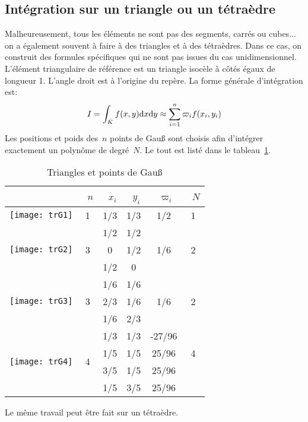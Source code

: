 \medskip
\subsection*{Intégration sur un triangle ou un tétraèdre} 

Malheureusement, tous les éléments ne sont pas des segments, carrés ou cubes... on a également souvent à faire à des triangles et à des tétraèdres. Dans ce cas, on construit des formules spécifiques qui ne sont pas issues du cas unidimensionnel. L'élément triangulaire de référence est un triangle isocèle à côtés égaux de longueur 1. L'angle droit est à l'origine du repère. La forme générale d'intégration est: 
\begin{equation}
 I=\int_{\hat{K}} f(x,y)\text{d} x\text{d} y \approx \sum_{i=1}^n \varpi_if(x_i,y_i) 
\end{equation}
Les positions et poids des~$n$ points de Gauß sont choisis afin d'intégrer exactement un polynôme de degré~$N$. Le tout est listé dans le tableau~\ref{tab:IntNum:TriGauss}.
\begin{table}[ht]\centering
\begin{tabular}{cccccc}
 &~$n$ &~$x_i$ &~$y_i$ &~$\varpi_i$ &~$N$\\ \hline 
 \texttt{[image: trG1]} & 1 & 1/3 & 1/3 & 1/2 & 1\\ \hline 
 \multirow{3}{*}{\texttt{[image: trG2]}} & \multirow{3}{*}{3} & 1/2 & 1/2 & \multirow{3}{*}{1/6} & \multirow{3}{*}{2}\\[+2mm] 
 &&0&1/2&&\\[+2mm] 
 &&1/2&0&&\\[+12mm] \hline 
 \multirow{3}{*}{\texttt{[image: trG3]}} & \multirow{3}{*}{3} & 1/6 & 1/6 & \multirow{3}{*}{1/6} & \multirow{3}{*}{2}\\[+2mm] 
 &&2/3 & 1/6 &&\\[+2mm] 
 &&1/6&2/3&&\\[+12mm] \hline 
 \multirow{4}{*}{\texttt{[image: trG4]}} & \multirow{4}{*}{4} & 1/3 & 1/3 & -27/96 & \multirow{3}{*}{4}\\[+2mm] 
 &&1/5&1/5&25/96&\\[+2mm] 
 &&3/5&1/5&25/96&\\[+2mm] 
 &&1/5&3/5&25/96&\\[+12mm] 
\end{tabular} 
\caption{Triangles et points de Gauß}\label{tab:IntNum:TriGauss}
\end{table} 
 Le même travail peut être fait sur un tétraèdre. 